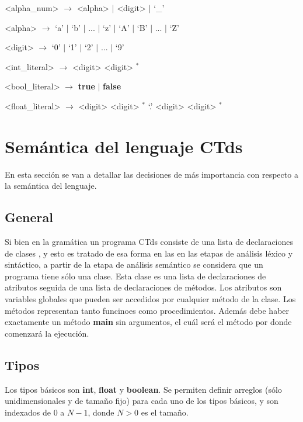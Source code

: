 \documentclass[11pt,a4paper]{article}
\begin{document}
\begin{grammar}
<alpha_num> $\rightarrow$ <alpha> $\mid$ <digit> $\mid$ `_'

<alpha> $\rightarrow$ `a' $\mid$ `b' $\mid$ ... $\mid$ `z' $\mid$ `A' $\mid$ `B' $\mid$ ... $\mid$ `Z'

<digit> $\rightarrow$ `0' $\mid$ `1' $\mid$ `2' $\mid$ ... $\mid$ `9'

<int_literal> $\rightarrow$ <digit> <digit> $^{*}$

<bool_literal> $\rightarrow$ \textbf{true} $\mid$ \textbf{false}

<float_literal> $\rightarrow$ <digit> <digit> $^{*}$ `.' <digit> <digit> $^{*}$

\end{grammar}

\section{Semántica del lenguaje CTds}
\label{sec:semanticactds}

En esta sección se van a detallar las decisiones de más importancia con respecto a la semántica del lenguaje.

\subsection{General}
\label{subsec:general}

Si bien en la gramática un programa CTds consiste de una lista de declaraciones de clases , y esto es tratado de esa forma en las en las etapas de análisis léxico y sintáctico, a partir de la etapa de análisis semántico se considera que un programa tiene sólo una clase. Esta clase es una lista de declaraciones de atributos seguida de una lista de declaraciones de métodos. Los atributos son variables globales que pueden ser accedidos por cualquier método de la clase. Los métodos representan tanto funcinoes como procedimientos. Además debe haber exactamente un método \textbf{main} sin argumentos, el cuál será el método por donde comenzará la ejecución.

\subsection{Tipos}

Los tipos básicos son \textbf{int}, \textbf{float} y \textbf{boolean}. Se permiten definir arreglos (sólo unidimensionales y de tamaño fijo) para cada uno de los tipos básicos, y son indexados de $0$ a $N-1$, donde $N>0$ es el tamaño. 
\end{document}
